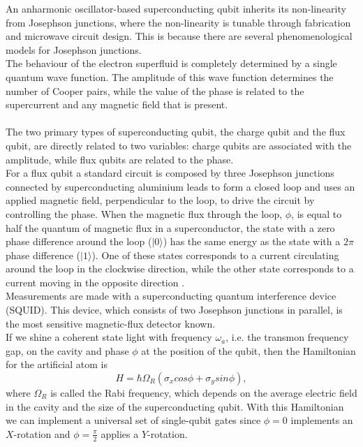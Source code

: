 An anharmonic oscillator-based superconducting qubit inherits its non-linearity from Josephson junctions, where the non-linearity is tunable through fabrication and microwave circuit design. This is because there are several phenomenological models for Josephson junctions. \\
The behaviour of the electron superfluid is completely determined by a single quantum wave function. The amplitude of this wave function determines the number of Cooper pairs, while the value of the phase is related to the supercurrent and any magnetic field that is present. \\
\\
The two primary types of superconducting qubit, the charge qubit and the flux qubit, are directly related to two variables: charge qubits are associated with the amplitude, while flux qubits are related to the phase. \\
For a flux qubit a standard circuit is composed by three Josephson junctions connected by superconducting aluminium leads to form a closed loop and uses an applied magnetic field, perpendicular to the loop, to drive the circuit by controlling the phase. When the magnetic flux through the loop, $\phi$, is equal to half the quantum of magnetic flux in a superconductor, the state with a zero phase difference around the loop ($|0\rangle$) has the same energy as the state with a $2\pi$ phase difference ($|1\rangle$). One of these states corresponds to a current circulating around the loop in the clockwise direction, while the other state corresponds to a current moving in the opposite direction \cite{Materise2017Aug}. \\
Measurements are made with a superconducting quantum interference device (SQUID). This device, which consists of two Josephson junctions in parallel, is the most sensitive magnetic-flux detector known. \\
If we shine a coherent state light with frequency $\omega_a$, i.e. the transmon frequency gap, on the cavity and phase $\phi$ at the position of the qubit, then the Hamiltonian for the artificial atom is
\begin{equation}
    H = \hbar \Omega_R (\sigma_x cos\phi + \sigma_y sin\phi),
\end{equation}
where $\Omega_R$ is called the Rabi frequency, which depends on the average electric field in the cavity and the size of the superconducting qubit. With this Hamiltonian we can implement a universal set of single-qubit gates since $\phi = 0$ implements an $X$-rotation and $\phi = \frac{\pi}{2}$ applies a $Y$-rotation. \\
